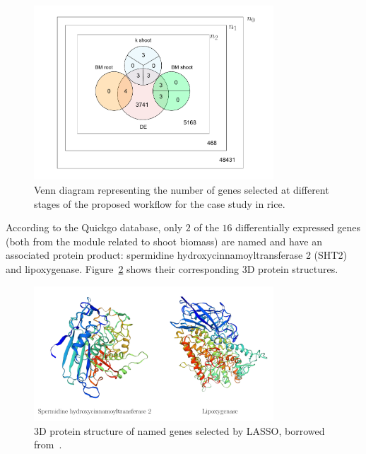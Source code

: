 \begin{figure}[htbp]
  \centering
    \includegraphics[clip,width=0.8\textwidth]{figures/figure6.pdf}
   \caption[Venn diagram for the case study in rice]%
   {Venn diagram representing the number of genes selected at
    different stages of the proposed workflow for the case study in
    rice.}
  \label{fig:final_genes}
\end{figure}

According to the Quickgo database, only $2$ of the $16$ differentially
expressed genes (both from the module related to shoot biomass) are
named and have an associated protein product: spermidine
hydroxycinnamoyltransferase 2 (SHT2) and lipoxygenase.
Figure~\ref{fig:3d} shows their corresponding 3D protein structures.
\vspace{0.5cm}

\begin{figure}[htbp]
  \centering
    \includegraphics[clip,width=0.8\textwidth]{figures/figure7.pdf}
  \caption{3D protein structure of named genes selected by LASSO, borrowed from~\cite{szklarczyk2016string}.}
  \label{fig:3d}
\end{figure}

